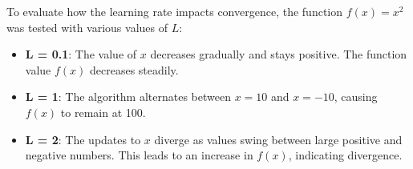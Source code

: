 \documentclass{article}
\begin{document}
To evaluate how the learning rate impacts convergence, the function $f(x) = x^2$ was tested with various values of $L$:

\begin{itemize}
    \item \textbf{L = 0.1}: The value of $x$ decreases gradually and stays positive. The function value $f(x)$ decreases steadily.
    \item \textbf{L = 1}: The algorithm alternates between $x = 10$ and $x = -10$, causing $f(x)$ to remain at 100.
    \item \textbf{L = 2}: The updates to $x$ diverge as values swing between large positive and negative numbers. This leads to an increase in $f(x)$, indicating divergence.
\end{itemize}
\end{document}
